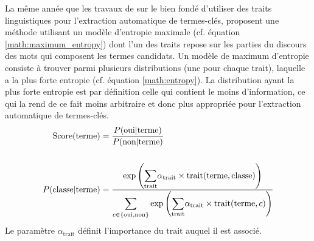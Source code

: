           La même année que les travaux de \citet{hulth2003keywordextraction} sur
          le bien fondé d'utiliser des traits linguistiques pour l'extraction
          automatique de termes-clés, \citet{sujian2003maximumentropy} proposent une
          méthode utilisant un modèle d'entropie maximale (cf. équation
          \ref{math:maximum_entropy}) dont l'un des traits repose sur les parties du
          discours des mots qui composent les termes candidats. Un modèle de maximum
          d'entropie consiste à trouver parmi plusieurs distributions (une pour
          chaque trait), laquelle a la plus forte entropie (cf. équation
          \ref{math:entropy}). La distribution ayant la plus forte entropie est par
          définition celle qui contient le moins d'information, ce qui la rend de ce
          fait moins arbitraire et donc plus appropriée pour l'extraction
          automatique de termes-clés.
          \begin{align}
            \text{Score}(\text{terme}) &= \frac{P(\text{oui} | \text{terme})}{P(\text{non} | \text{terme})} \label{math:maximum_entropy}\\
            \notag\\
            P(\text{classe} | \text{terme}) &= \frac{\exp\left(\mathlarger{\sum}_{\text{trait}} \alpha_{\text{trait}} \times \text{trait}(\text{terme}, \text{classe})\right)}{\mathlarger{\sum}_{c \in \{\text{oui}, \text{non}\}} \exp\left(\mathlarger{\sum}_{\text{trait}} \alpha_{\text{trait}} \times \text{trait}(\text{terme}, c)\right)} \label{math:entropy}
          \end{align}
          Le paramètre $\alpha_{\text{trait}}$ définit l'importance du
          $\text{trait}$ auquel il est associé.

